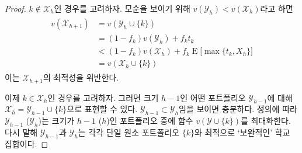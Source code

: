 \documentclass[11pt]{article} %
\newif\ifen
\theoremstyle{definition}
\theoremstyle{definition}
\begin{document}
\begin{proof}
\ifen Suppose $k \notin \mathcal{X}_h$. To get a contradiction, assume that $v(\mathcal{Y}_h) < v(\mathcal{X}_h)$. Then
\else $k \notin \mathcal{X}_h$인 경우를 고려하자. 모순을 보이기 위해 $v(\mathcal{Y}_h) < v(\mathcal{X}_h)$라고 하면 \fi
\begin{align}
\begin{split}
v(\mathcal{X}_{h+1})&= v(\mathcal{Y}_{h} \cup \{k\}) \\
&= (1 - f_k) v(\mathcal{Y}_h) + f_k t_k \\
& < (1 - f_k) v(\mathcal{X}_h) + f_k \operatorname{E}\bigl[ \max\{t_k, X_h\}\bigr]\\
&=  v(\mathcal{X}_h\cup \{k\})
\end{split}
\end{align}
\ifen contradicts the optimality of $\mathcal{X}_{h+1}$.
\else 이는 $\mathcal{X}_{h+1}$의 최적성을 위반한다.\fi

\ifen Now suppose that $k \in \mathcal{X}_h$. We can write $\mathcal{X}_h = \mathcal{Y}_{h-1} \cup \{k\}$, where $ \mathcal{Y}_{h-1}$ is some portfolio of size $h-1$. It suffices to show that $ \mathcal{Y}_{h-1} \subset \mathcal{Y}_h$. By definition, $\mathcal{Y}_{h-1}$ (respectively, $\mathcal{Y}_{h}$) maximizes the function $v(\mathcal{Y}\cup\{k\})$ over portfolios of size $h-1$ (respectively, $h$) that do not include $k$. That is, $\mathcal{Y}_{h-1}$ and $\mathcal{Y}_h$ are the optimal \emph{complements} to the singleton portfolio $\{k\}$.
\else 이제 $k \in \mathcal{X}_h$인 경우를 고려하자. 그러면 크기 $h-1$인 어떤 포트폴리오 $\mathcal{Y}_{h-1}$에 대해 $\mathcal{X}_h = \mathcal{Y}_{h-1} \cup \{k\}$으로 표현할 수 있다. $\mathcal{Y}_{h-1} \subset \mathcal{Y}_h$임을 보이면 충분하다. 정의에 따라 $\mathcal{Y}_{h-1}$ ($\mathcal{Y}_{h}$)는 크기가 $h-1$ ($h$)인 포트폴리오 중에 함수 $v(\mathcal{Y}\cup\{k\})$를 최대화한다. 다시 말해 $\mathcal{Y}_{h-1}$과 $\mathcal{Y}_h$는 각각 단일 원소 포트폴리오 $\{k\}$와 최적으로 `보완적인' 학교 집합이다. \fi


\end{proof}
\end{document}
